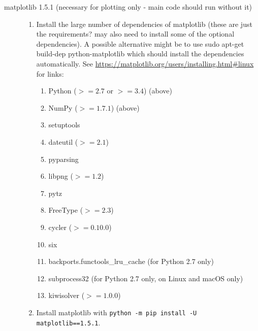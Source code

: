 \documentclass{article}
\begin{document}
\begin{description}
\begin{enumerate}
\end{enumerate} 
\item[matplotlib 1.5.1 (necessary for plotting only - main code should run without it)] \hfill
\begin{enumerate} 
\item Install the large number of dependencies of matplotlib (these are just the requirements? may also need to install some of the optional dependencies). A possible alternative might be to use sudo apt-get build-dep python-matplotlib which should install the dependencies automatically. See \url{https://matplotlib.org/users/installing.html#linux} for links:
\begin{enumerate}  
\item	Python ($>= 2.7$ or $>= 3.4$) (above)
\item	NumPy ($>= 1.7.1$) (above)
\item	setuptools
\item	dateutil ($>= 2.1$)
\item	pyparsing
\item	libpng ($>= 1.2$)
\item	pytz
\item	FreeType ($>= 2.3$)
\item	cycler ($>= 0.10.0$)
\item	six
\item	backports.functools\_lru\_cache (for Python 2.7 only)
\item	subprocess32 (for Python 2.7 only, on Linux and macOS only)
\item kiwisolver ($>= 1.0.0$)
\end{enumerate}
\item Install matplotlib with \lstinline[style=bash_input]{python -m pip install -U matplotlib==1.5.1}.
\end{enumerate}
\end{description}
\end{document}
